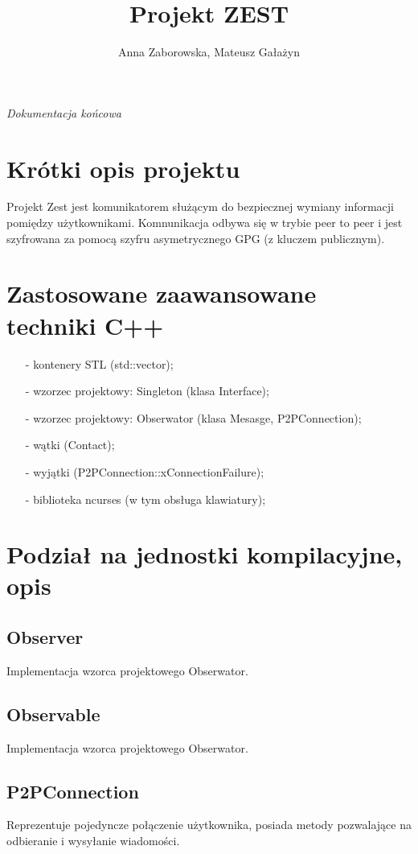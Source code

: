 \documentclass[11pt,a4paper]{article}
\author{Anna Zaborowska, Mateusz Gałażyn}
\title{Projekt ZEST}
\begin{document}
\maketitle

\begin{center}
\Large {\textsl{Dokumentacja końcowa}}
\end{center}

\section{Krótki opis projektu}

Projekt Zest jest komunikatorem służącym do bezpiecznej wymiany informacji pomiędzy użytkownikami. Komnunikacja odbywa się w trybie peer to peer i jest szyfrowana za pomocą szyfru asymetrycznego GPG (z kluczem publicznym).

\section{Zastosowane zaawansowane techniki C++}

\begin{itemize}
\item[-] kontenery STL (std::vector);
\item[-] wzorzec projektowy: Singleton (klasa Interface);
\item[-] wzorzec projektowy: Obserwator (klasa Mesasge,  P2PConnection);
\item[-] wątki (Contact);
\item[-] wyjątki (P2PConnection::xConnectionFailure);
\item[-] biblioteka ncurses (w tym obsługa klawiatury);
\end{itemize}

\section{Podział na jednostki kompilacyjne, opis}
\subsection{Observer}
Implementacja wzorca projektowego Obserwator.

\subsection{Observable}
Implementacja wzorca projektowego Obserwator.

\subsection{P2PConnection}
Reprezentuje pojedyncze połączenie użytkownika, posiada metody pozwalające na odbieranie i wysyłanie wiadomości.
\end{document}

